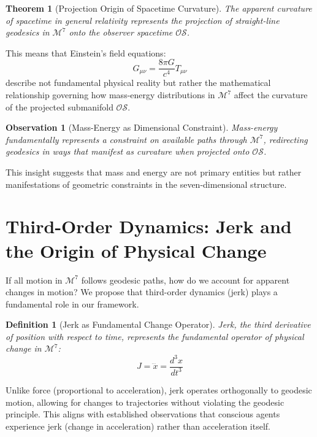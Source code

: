 \documentclass{article}
\newtheorem{definition}{Definition}
\newtheorem{theorem}{Theorem}
\newtheorem{observation}{Observation}
\begin{document}
\begin{theorem}[Projection Origin of Spacetime Curvature]
The apparent curvature of spacetime in general relativity represents the projection of straight-line geodesics in $\mathcal{M}^7$ onto the observer spacetime $\mathcal{OS}$.
\end{theorem}

This means that Einstein's field equations:
\begin{equation}
G_{\mu\nu} = \frac{8\pi G}{c^4}T_{\mu\nu}
\end{equation}
describe not fundamental physical reality but rather the mathematical relationship governing how mass-energy distributions in $\mathcal{M}^7$ affect the curvature of the projected submanifold $\mathcal{OS}$.

\begin{observation}[Mass-Energy as Dimensional Constraint]
Mass-energy fundamentally represents a constraint on available paths through $\mathcal{M}^7$, redirecting geodesics in ways that manifest as curvature when projected onto $\mathcal{OS}$.
\end{observation}

This insight suggests that mass and energy are not primary entities but rather manifestations of geometric constraints in the seven-dimensional structure.

\section{Third-Order Dynamics: Jerk and the Origin of Physical Change}

If all motion in $\mathcal{M}^7$ follows geodesic paths, how do we account for apparent changes in motion? We propose that third-order dynamics (jerk) plays a fundamental role in our framework.

\begin{definition}[Jerk as Fundamental Change Operator]
Jerk, the third derivative of position with respect to time, represents the fundamental operator of physical change in $\mathcal{M}^7$:
\begin{equation}
J = \dddot{x} = \frac{d^3x}{dt^3}
\end{equation}
\end{definition}

Unlike force (proportional to acceleration), jerk operates orthogonally to geodesic motion, allowing for changes to trajectories without violating the geodesic principle. This aligns with established observations that conscious agents experience jerk (change in acceleration) rather than acceleration itself.
\end{document}
